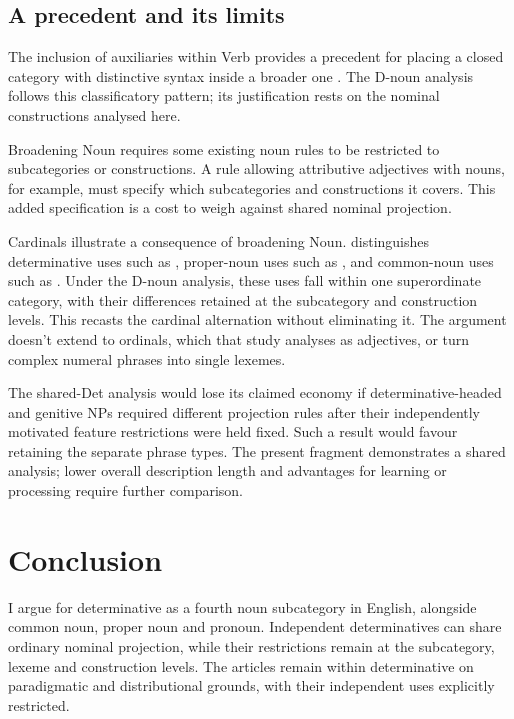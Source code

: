 \documentclass[12pt]{article}
\begin{document}
\subsection{A precedent and its limits}

The inclusion of auxiliaries within Verb provides a precedent for placing a closed category with distinctive syntax inside a broader one \citep{pullumwilson1977}. The D-noun analysis follows this classificatory pattern; its justification rests on the nominal constructions analysed here.

Broadening Noun requires some existing noun rules to be restricted to subcategories or constructions. A rule allowing attributive adjectives with nouns, for example, must specify which subcategories and constructions it covers. This added specification is a cost to weigh against shared nominal projection.

Cardinals illustrate a consequence of broadening Noun. \textcite{reynolds2026numerals} distinguishes determinative uses such as , proper-noun uses such as , and common-noun uses such as . Under the D-noun analysis, these uses fall within one superordinate category, with their differences retained at the subcategory and construction levels. This recasts the cardinal alternation without eliminating it. The argument doesn't extend to ordinals, which that study analyses as adjectives, or turn complex numeral phrases into single lexemes.

The shared-Det analysis would lose its claimed economy if determinative-headed and genitive NPs required different projection rules after their independently motivated feature restrictions were held fixed. Such a result would favour retaining the separate phrase types. The present fragment demonstrates a shared analysis; lower overall description length and advantages for learning or processing require further comparison.

\section{Conclusion}\label{sec:conclusion}

I argue for determinative as a fourth noun subcategory in English, alongside common noun, proper noun and pronoun. Independent determinatives can share ordinary nominal projection, while their restrictions remain at the subcategory, lexeme and construction levels. The articles remain within determinative on paradigmatic and distributional grounds, with their independent uses explicitly restricted.
\end{document}
